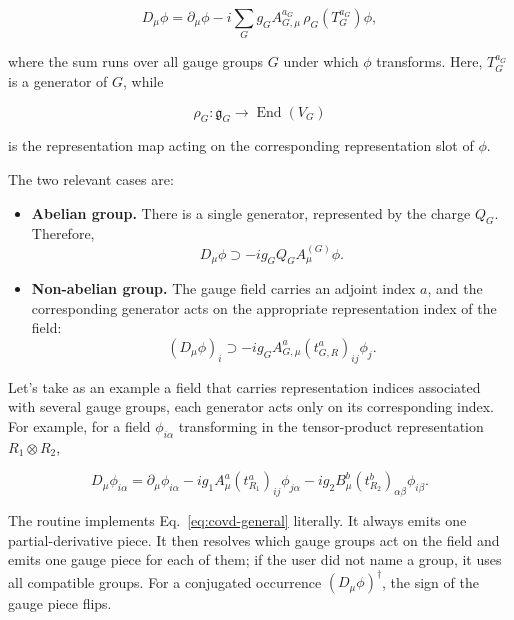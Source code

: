 \begin{equation}
    D_\mu \phi
    =
    \partial_\mu \phi
    -
    i \sum_G g_G A^{a_G}_{G,\mu}\,
    \rho_G\!\left(T^{a_G}_G\right)\phi,
    \label{eq:covd-general}
\end{equation}

where the sum runs over all gauge groups $G$ under which $\phi$ transforms. Here, $T^{a_G}_G$ is a generator of $G$, while

\begin{equation}
    \rho_G : \mathfrak{g}_G \longrightarrow \operatorname{End}(V_G)
\end{equation}

is the representation map acting on the corresponding representation slot of $\phi$.

The two relevant cases are:

\begin{itemize}
    \item \textbf{Abelian group.} There is a single generator, represented by the charge $Q_G$. Therefore,
    \begin{equation}
        D_\mu \phi
        \supset
        -i g_G Q_G A^{(G)}_\mu \phi.
    \end{equation}

    \item \textbf{Non-abelian group.} The gauge field carries an adjoint index $a$, and the corresponding generator acts on the appropriate representation index of the field:
    \begin{equation}
        (D_\mu \phi)_i
        \supset
        -i g_G A^a_{G,\mu}
        \left(t^a_{G,R}\right)_{ij}\phi_j.
    \end{equation}
\end{itemize}

Let's take as an example a field that carries representation indices associated with several gauge groups, each generator acts only on its corresponding index. For example, for a field $\phi_{i\alpha}$ transforming in the tensor-product representation $R_1 \otimes R_2$,

\begin{equation}
    D_\mu \phi_{i\alpha}
    =
    \partial_\mu \phi_{i\alpha}
    -
    i g_1 A^a_\mu
    \left(t^a_{R_1}\right)_{ij}
    \phi_{j\alpha}
    -
    i g_2 B^b_\mu
    \left(t^b_{R_2}\right)_{\alpha\beta}
    \phi_{i\beta}.
\end{equation}

The routine  implements Eq.~\eqref{eq:covd-general} literally. It always emits one partial-derivative piece. It then resolves which gauge groups act on the field and emits one gauge piece for each of them; if the user did not name a group, it uses all compatible groups. For a conjugated occurrence $(D_\mu\phi)^\dagger$, the sign of the gauge piece flips.

